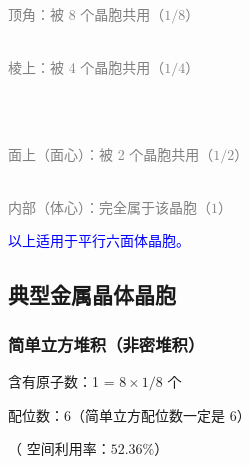         \noindent
        \begin{minipage}[t]{0.48\textwidth}
            \centering
            \\[2pt]
            \footnotesize\textcolor{gray}{顶角：被 8 个晶胞共用（\(1/8\)）}
        \end{minipage}\hfill
        \begin{minipage}[t]{0.48\textwidth}
            \centering
            \\[2pt]
            \footnotesize\textcolor{gray}{棱上：被 4 个晶胞共用（\(1/4\)）}
        \end{minipage}\\[6pt]
        \noindent
        \begin{minipage}[t]{0.48\textwidth}
            \centering
            \\[2pt]
            \footnotesize\textcolor{gray}{面上（面心）：被 2 个晶胞共用（\(1/2\)）}
        \end{minipage}\hfill
        \begin{minipage}[t]{0.48\textwidth}
            \centering
            \\[2pt]
            \footnotesize\textcolor{gray}{内部（体心）：完全属于该晶胞（\(1\)）}
        \end{minipage}

        \textcolor{blue}{以上适用于平行六面体晶胞。}

        \subsection{典型金属晶体晶胞}\label{subsec:典型金属晶体晶胞}

            \subsubsection{简单立方堆积（非密堆积）}


                 含有原子数：1 = \(8 \times 1/8\) 个

                 配位数：6（简单立方配位数一定是 6）

                （ 空间利用率：\(52.36\%\)）

